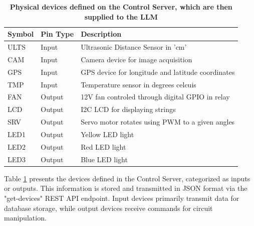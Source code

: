 \documentclass{ieeeaccess}
\begin{document}
\begin{table}
    \caption{\textbf{Physical devices defined on the Control Server, which are then supplied to the LLM}}
    \label{table1}
    \setlength{\tabcolsep}{3pt}
    \begin{tabular}{|p{30pt}|p{32pt}|p{165pt}|}
        \hline
        \textbf{Symbol} &
        \textbf{Pin Type}   &
        \textbf{Description}                                             \\
        \hline
        ULTS   &
        Input  &
        Ultrasonic Distance Sensor in 'cm'                      \\
        \hline
        CAM    &
        Input  &
        Camera device for image acquisition                       \\
        \hline
        GPS    &
        Input  &
        GPS device for longitude and latitude coordinates       \\
        \hline
        TMP    &
        Input  &
        Temperature sensor in degrees celcuis    \\
        \hline
        FAN    &
        Output &
        12V fan controled through digital GPIO in relay \\
        \hline
        LCD    &
        Output &
        I2C LCD for displaying strings                          \\
        \hline
        SRV    &
        Output &
        Servo motor rotates using PWM to a given angles         \\
        \hline
        LED1   &
        Output &
        Yellow LED light                                        \\
        \hline
        LED2   &
        Output &
        Red LED light                                           \\
        \hline
        LED3   &
        Output &
        Blue LED light                                          \\
        \hline
    \end{tabular}
\end{table}

Table \ref{table1} presents the devices defined in the Control Server, categorized as inputs or outputs. This information is stored and transmitted in JSON format via the "get-devices" REST API endpoint. Input devices primarily transmit data for database storage, while output devices receive commands for circuit manipulation.
\end{document}

